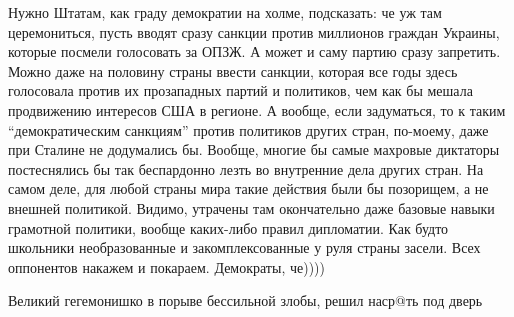 \begin{itemize}
Нужно Штатам, как граду демократии на холме, подсказать: че уж там
церемониться, пусть вводят сразу санкции против миллионов граждан Украины,
которые посмели голосовать за ОПЗЖ. А может и саму партию сразу запретить.
Можно даже на половину страны ввести санкции, которая все годы здесь голосовала
против их прозападных партий и политиков, чем как бы мешала продвижению
интересов США в регионе. А вообще, если задуматься, то к таким \enquote{демократическим
санкциям} против политиков других стран, по-моему, даже при Сталине не
додумались бы. Вообще, многие бы самые махровые диктаторы постеснялись бы так
беспардонно лезть во внутренние дела других стран. На самом деле, для любой
страны мира такие действия были бы позорищем, а не внешней политикой. Видимо,
утрачены там окончательно даже базовые навыки грамотной политики, вообще
каких-либо правил дипломатии. Как будто школьники необразованные и
закомплексованные у руля страны засели. Всех оппонентов накажем и покараем.
Демократы, че))))


Великий гегемонишко в порыве бессильной злобы, решил наср@ть под дверь


\end{itemize} %
